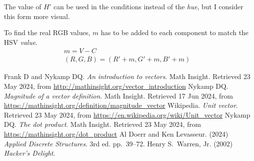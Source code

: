 \documentclass{article}
\begin{document}
The value of $H'$ can be used in the conditions instead of the \textit{hue}, but
I consider this form more visual.

To find the real RGB values, $m$ has to be added to each component to match the
HSV \textit{value}.
\begin{gather*}
  m = V - C \\
  (R, G, B) = (R' + m, G' + m, B' + m)
\end{gather*}


\clearpage
{}
{}

\begin{thebibliography}{9}
  Frank D and Nykamp DQ\@. \emph{An introduction to vectors}. Math
  Insight. Retrieved 23 May 2024, from
  \url{http://mathinsight.org/vector_introduction}
  Nykamp DQ\@. \emph{Magnitude of a vector definition}. Math
  Insight. Retrieved 17 Jun 2024, from
  \url{https://mathinsight.org/definition/magnitude_vector}
  Wikipedia\@. \emph{Unit vector}. Retrieved 23 May 2024, from
  \url{https://en.wikipedia.org/wiki/Unit_vector}
  Nykamp DQ\@. \emph{The dot product}. Math Insight. Retrieved 23 May 2024,
  from \url{https://mathinsight.org/dot_product}
  Al Doerr and Ken Levasseur. (2024) \emph{Applied Discrete Structures}.
  3rd ed\@. pp.~39--72.
  Henry S.~Warren, Jr. (2002) \emph{Hacker's Delight}.
\end{thebibliography}
\end{document}
